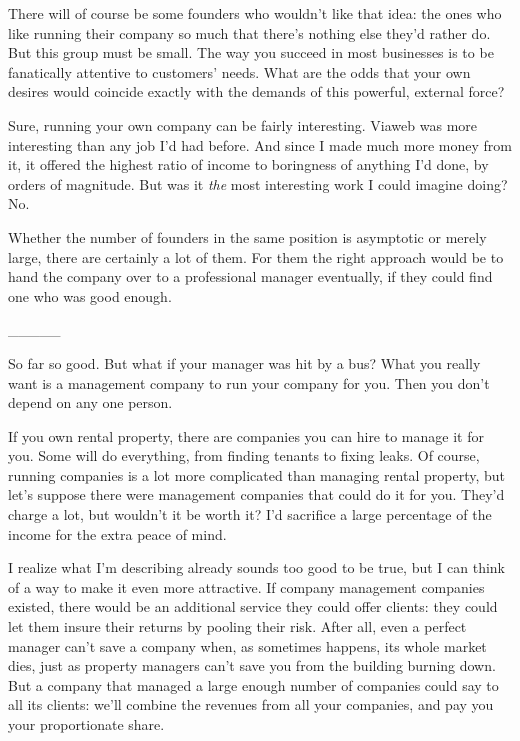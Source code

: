 There
                  will of course be some founders who wouldn't like that idea:
                  the ones who like running their company so much that there's
                  nothing else they'd rather do. But this group must be small.
                  The way you succeed in most businesses is to be fanatically
                  attentive to customers' needs. What are the odds that your own
                  desires would coincide exactly with the demands of this
                  powerful, external force?

Sure, running your own
                  company can be fairly interesting. Viaweb was more interesting
                  than any job I'd had before. And since I made much more money
                  from it, it offered the highest ratio of income to boringness
                  of anything I'd done, by orders of magnitude. But was it
                  \emph{the} most interesting work I could imagine doing? No.

Whether
                  the number of founders in the same position is asymptotic or
                  merely large, there are certainly a lot of them. For them the
                  right approach would be to hand the company over to a
                  professional manager eventually, if they could find one who
                  was good enough.


                  \_\_\_\_\_
                  

So far so good. But what if your manager was hit
                  by a bus? What you really want is a management company to run
                  your company for you. Then you don't depend on any one
                  person.

If you own rental property, there are
                  companies you can hire to manage it for you. Some will do
                  everything, from finding tenants to fixing leaks. Of course,
                  running companies is a lot more complicated than managing
                  rental property, but let's suppose there were management
                  companies that could do it for you. They'd charge a lot, but
                  wouldn't it be worth it? I'd sacrifice a large percentage of
                  the income for the extra peace of mind.

I realize
                  what I'm describing already sounds too good to be true, but I
                  can think of a way to make it even more attractive. If company
                  management companies existed, there would be an additional
                  service they could offer clients: they could let them insure
                  their returns by pooling their risk. After all, even a perfect
                  manager can't save a company when, as sometimes happens, its
                  whole market dies, just as property managers can't save you
                  from the building burning down. But a company that managed a
                  large enough number of companies could say to all its clients:
                  we'll combine the revenues from all your companies, and pay
                  you your proportionate share.


